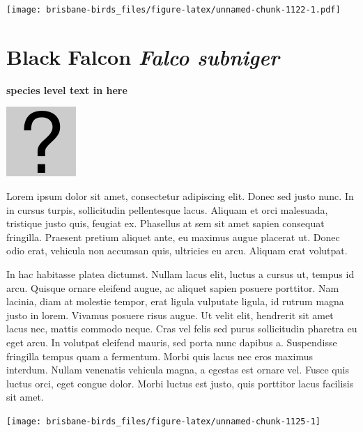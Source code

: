 \documentclass[]{book}
\let\origfigure\figure
\let\endorigfigure\endfigure
\renewenvironment{figure}[1][2] {
  \expandafter\origfigure\expandafter[H]
} {
  \endorigfigure
}
\begin{document}
\begin{figure}
\centering
\texttt{[image: brisbane-birds\_files/figure-latex/unnamed-chunk-1122-1.pdf]}
\caption{\label{fig:unnamed-chunk-1122}insert figure caption}
\end{figure}

\section{\texorpdfstring{Black Falcon \emph{Falco
subniger}}{Black Falcon Falco subniger}}\label{black-falcon-falco-subniger}

\textbf{species level text in here}

\begin{figure}
\centering
\includegraphics{assets/missing.png}
\caption{No image for species}
\end{figure}

Lorem ipsum dolor sit amet, consectetur adipiscing elit. Donec sed justo
nunc. In in cursus turpis, sollicitudin pellentesque lacus. Aliquam et
orci malesuada, tristique justo quis, feugiat ex. Phasellus at sem sit
amet sapien consequat fringilla. Praesent pretium aliquet ante, eu
maximus augue placerat ut. Donec odio erat, vehicula non accumsan quis,
ultricies eu arcu. Aliquam erat volutpat.

In hac habitasse platea dictumst. Nullam lacus elit, luctus a cursus ut,
tempus id arcu. Quisque ornare eleifend augue, ac aliquet sapien posuere
porttitor. Nam lacinia, diam at molestie tempor, erat ligula vulputate
ligula, id rutrum magna justo in lorem. Vivamus posuere risus augue. Ut
velit elit, hendrerit sit amet lacus nec, mattis commodo neque. Cras vel
felis sed purus sollicitudin pharetra eu eget arcu. In volutpat eleifend
mauris, sed porta nunc dapibus a. Suspendisse fringilla tempus quam a
fermentum. Morbi quis lacus nec eros maximus interdum. Nullam venenatis
vehicula magna, a egestas est ornare vel. Fusce quis luctus orci, eget
congue dolor. Morbi luctus est justo, quis porttitor lacus facilisis sit
amet.

\begin{figure}
\texttt{[image: brisbane-birds\_files/figure-latex/unnamed-chunk-1125-1]} \caption{insert figure caption}\label{fig:unnamed-chunk-1125}
\end{figure}
\end{document}
